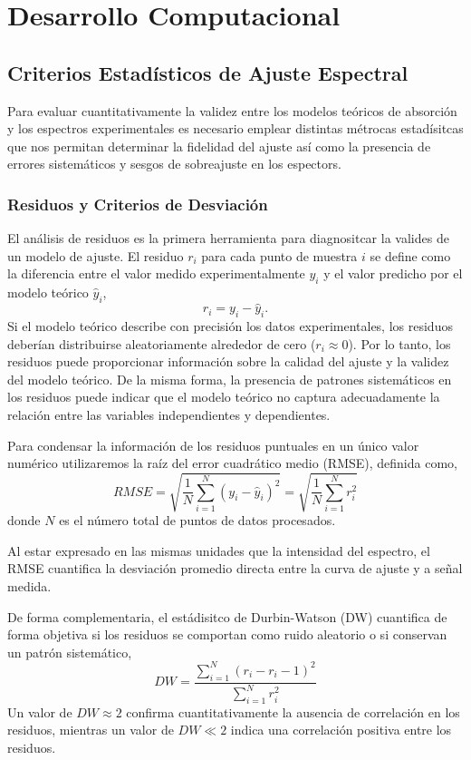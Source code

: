 \section{Desarrollo Computacional}
\subsection{Criterios Estadísticos de Ajuste Espectral}
Para evaluar cuantitativamente la validez entre los modelos teóricos de absorción y los espectros experimentales es necesario emplear distintas métrocas estadísitcas que nos permitan determinar la fidelidad del ajuste así como la presencia de errores sistemáticos y sesgos de sobreajuste en los espectors.
\subsubsection{Residuos y Criterios de Desviación}
El análisis de residuos es la primera herramienta para diagnositcar la valides de un modelo de ajuste. El residuo $r_i$ para cada punto de muestra $i$ se define como la diferencia entre el valor medido experimentalmente $y_i$ y el valor predicho por el modelo teórico $\hat{y}_i$,
\begin{equation}
    r_i = y_i - \hat{y}_i.
\end{equation}
Si el modelo teórico describe con precisión los datos experimentales, los residuos deberían distribuirse aleatoriamente alrededor de cero ($r_i \approx 0$). Por lo tanto, los residuos puede proporcionar información sobre la calidad del ajuste y la validez del modelo teórico. De la misma forma, la presencia de patrones sistemáticos en los residuos puede indicar que el modelo teórico no captura adecuadamente la relación entre las variables independientes y dependientes.

Para condensar la información de los residuos puntuales en un único valor numérico utilizaremos la raíz del error cuadrático medio (RMSE), definida como,
\begin{equation}
    RMSE = \sqrt{\frac{1}{N} \sum_{i=1}^{N}(y_i - \hat{y}_i)^2} =  \sqrt{\frac{1}{N} \sum_{i=1}^{N}r_i^2}
\end{equation}
donde $N$ es el número total de puntos de datos procesados.

Al estar expresado en las mismas unidades que la intensidad del espectro, el RMSE cuantifica la desviación promedio directa entre la curva de ajuste y a señal medida. 

De forma complementaria, el estádisitco de Durbin-Watson (DW) cuantifica de forma objetiva si los residuos se comportan como ruido aleatorio o si conservan un patrón sistemático,
\begin{equation}
    DW = \frac{\sum_{i=1}^N (r_i - r_i-1)^2}{\sum_{i=1}^N r_i^2}
\end{equation}
Un valor de $DW \approx 2$ confirma cuantitativamente la ausencia de correlación en los residuos, mientras un valor de $DW \ll 2$ indica una correlación positiva entre los residuos.

